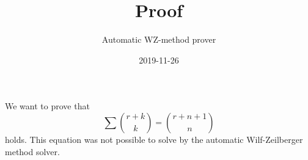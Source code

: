 \documentclass{article}
\title{Proof}
\author{Automatic WZ-method prover}
\date{2019-11-26}
\begin{document}
\maketitle
We want to prove that
\begin{equation}\label{Eq: 1}
\sum \binom{r+k}{k} = \binom{r+n+1}{n}
\end{equation}
holds. This equation was not possible to solve by the automatic Wilf-Zeilberger method solver.
\end{document}
